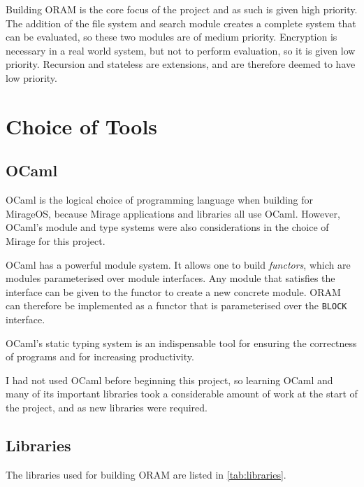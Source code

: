 \documentclass[12pt,a4paper,twoside,openright]{report}
\begin{document}
Building ORAM is the core focus of the project and as such is given high priority. The addition of the file system and search module creates a complete system that can be evaluated, so these two modules are of medium priority. Encryption is necessary in a real world system, but not to perform evaluation, so it is given low priority. Recursion and stateless are extensions, and are therefore deemed to have low priority.

\section{Choice of Tools}

\subsection{OCaml}

OCaml is the logical choice of programming language when building for MirageOS, because Mirage applications and libraries all use OCaml. However, OCaml's module and type systems were also considerations in the choice of Mirage for this project.

OCaml has a powerful module system. It allows one to build \emph{functors}, which are modules parameterised over module interfaces. Any module that satisfies the interface can be given to the functor to create a new concrete module. ORAM can therefore be implemented as a functor that is parameterised over the \texttt{BLOCK} interface.

OCaml's static typing system is an indispensable tool for ensuring the correctness of programs and for increasing productivity.

I had not used OCaml before beginning this project, so learning OCaml and many of its important libraries took a considerable amount of work at the start of the project, and as new libraries were required.

\subsection{Libraries}
\label{subsec:libraries}

The libraries used for building ORAM are listed in \cref{tab:libraries}.
\end{document}
